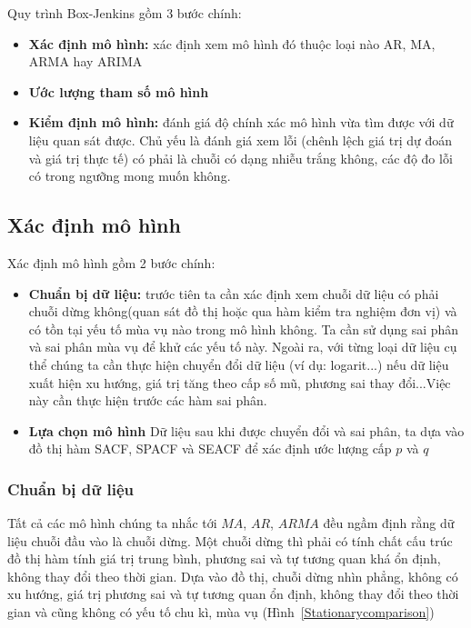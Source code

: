 Quy trình Box-Jenkins gồm 3 bước chính:
\begin{itemize}
\item \textbf{Xác định mô hình:} xác định xem mô hình đó thuộc loại nào AR, MA, ARMA hay ARIMA
\item \textbf{Ước lượng tham số mô hình}
\item \textbf{Kiểm định mô hình:} đánh giá độ chính xác mô hình vừa tìm được với dữ liệu quan sát được. Chủ yếu là đánh giá xem lỗi (chênh lệch giá trị dự đoán và giá trị thực tế) có phải là chuỗi có dạng nhiễu trắng không, các độ đo lỗi có trong ngưỡng mong muốn không.
\end{itemize}
\subsection{Xác định mô hình}
Xác định mô hình gồm 2 bước chính:
\begin{itemize}
\item \textbf{Chuẩn bị dữ liệu:} trước tiên ta cần xác định xem chuỗi dữ liệu có phải chuỗi dừng không(quan sát đồ thị hoặc qua hàm kiểm tra nghiệm đơn vị) và có tồn tại yếu tố mùa vụ nào trong mô hình không. Ta cần sử dụng sai phân và sai phân mùa vụ để khử các yếu tố này. Ngoài ra,  với từng loại dữ liệu cụ thể chúng ta cần thực hiện chuyển đổi dữ liệu (ví dụ: logarit...) nếu dữ liệu xuất hiện xu hướng, giá trị tăng theo cấp số mũ, phương sai thay đổi...Việc này cần thực hiện trước các hàm sai phân.

\item \textbf{Lựa chọn mô hình} Dữ liệu sau khi được chuyển đổi và sai phân, ta dựa vào đồ thị hàm SACF, SPACF và SEACF để xác định ước lượng cấp $p$ và $q$
\end{itemize}

\subsubsection{Chuẩn bị dữ liệu}
Tất cả các mô hình chúng ta nhắc tới $MA$, $AR$, $ARMA$ đều ngầm định rằng dữ liệu chuỗi đầu vào là chuỗi dừng. Một chuỗi dừng thì phải có tính chất cấu trúc đồ thị hàm tính giá trị trung bình, phương sai và tự tương quan khá ổn định, không thay đổi theo thời gian. Dựa vào đồ thị, chuỗi dừng nhìn phẳng, không có xu hướng, giá trị phương sai và tự tương quan ổn định, không thay đổi theo thời gian và cũng không có yếu tố chu kì, mùa vụ (Hình~\ref{Stationarycomparison})

